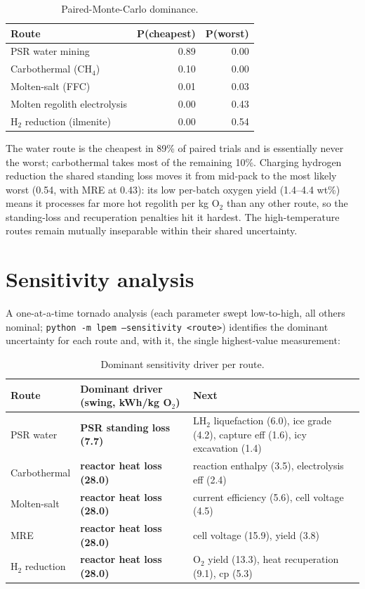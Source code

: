 \documentclass[11pt,a4paper]{article}
\begin{document}
\begin{table}[ht]
  \centering
  \caption{Paired-Monte-Carlo dominance.}
  \begin{tabular}{lrr}
    \toprule
    Route & P(cheapest) & P(worst) \\
    \midrule
    PSR water mining             & 0.89 & 0.00 \\
    Carbothermal (CH$_4$)        & 0.10 & 0.00 \\
    Molten-salt (FFC)            & 0.01 & 0.03 \\
    Molten regolith electrolysis & 0.00 & 0.43 \\
    H$_2$ reduction (ilmenite)   & 0.00 & 0.54 \\
    \bottomrule
  \end{tabular}
  \label{tab:dominance}
\end{table}

The water route is the cheapest in 89\% of paired trials and is essentially never the
worst; carbothermal takes most of the remaining 10\%. Charging hydrogen reduction the
shared standing loss moves it from mid-pack to the most likely worst (0.54, with MRE at
0.43): its low per-batch oxygen yield (1.4--4.4 wt\%) means it processes far more hot
regolith per kg O$_2$ than any other route, so the standing-loss and recuperation
penalties hit it hardest. The high-temperature routes remain mutually inseparable within
their shared uncertainty.

\section{Sensitivity analysis}

A one-at-a-time tornado analysis (each parameter swept low-to-high, all others nominal;
\texttt{python -m lpem --sensitivity <route>}) identifies the dominant uncertainty for
each route and, with it, the single highest-value measurement:

\begin{table}[ht]
  \centering
  \caption{Dominant sensitivity driver per route.}
  \begin{tabular}{lll}
    \toprule
    Route & Dominant driver (swing, kWh/kg O$_2$) & Next \\
    \midrule
    PSR water & \textbf{PSR standing loss (7.7)} & LH$_2$ liquefaction (6.0), ice grade (4.2), capture eff (1.6), icy excavation (1.4) \\
    Carbothermal & \textbf{reactor heat loss (28.0)} & reaction enthalpy (3.5), electrolysis eff (2.4) \\
    Molten-salt & \textbf{reactor heat loss (28.0)} & current efficiency (5.6), cell voltage (4.5) \\
    MRE & \textbf{reactor heat loss (28.0)} & cell voltage (15.9), yield (3.8) \\
    H$_2$ reduction & \textbf{reactor heat loss (28.0)} & O$_2$ yield (13.3), heat recuperation (9.1), cp (5.3) \\
    \bottomrule
  \end{tabular}
  \label{tab:sensitivity}
\end{table}
\end{document}
